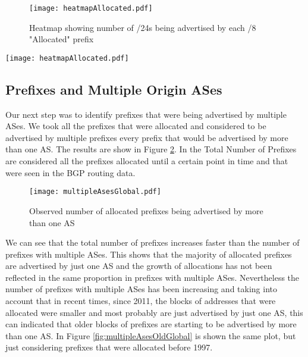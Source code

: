 \documentclass[11pt,a4paper]{scrreprt}
\begin{document}
\begin{figure}[!h]
\centering
\texttt{[image: heatmapAllocated.pdf]}
\caption{Heatmap showing number of /24s being advertised by each /8 "Allocated" prefix}
\label{fig:heatmapAllocated}
\end{figure}


\begin{sidewaysfigure}[!h]

\texttt{[image: heatmapAllocated.pdf]}
\caption{Heatmap showing number of /24s being advertised by each /8 "Allocated" prefix}
\label{fig:heatmapAllocatedSideWays}
\end{sidewaysfigure}


\subsection{Prefixes and Multiple Origin ASes}


Our next step was to identify prefixes that were being advertised by multiple ASes. We took all the prefixes that were allocated and considered to be advertised by multiple prefixes every prefix that would be advertised by more than one AS.
The results are show in Figure \ref{fig:multipleAsesGlobal}. In the Total Number of Prefixes are considered all the prefixes allocated until a certain point in time and that were seen in the BGP routing data.
 
\begin{figure}[!h]
\centering
\texttt{[image: multipleAsesGlobal.pdf]}
\caption{Observed number of allocated prefixes being advertised by more than one AS}
\label{fig:multipleAsesGlobal}
\end{figure}

We can see that the total number of prefixes increases faster than the number of prefixes with multiple ASes. This shows that the majority of allocated prefixes are advertised by just one AS and the growth of allocations has not been reflected in the same proportion in prefixes with multiple ASes. Nevertheless the number of prefixes with multiple ASes has been increasing and taking into account that in recent times, since 2011, the blocks of addresses that were allocated were smaller and most probably are just advertised by just one AS, this can indicated that older blocks of prefixes are starting to be advertised by more than one AS. 
In Figure \ref{fig:multipleAsesOldGlobal} is shown the same plot, but just considering prefixes that were allocated before 1997.
\end{document}
